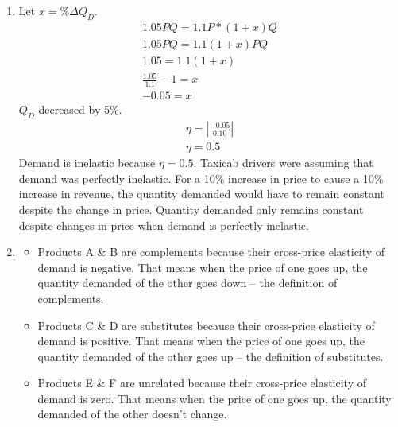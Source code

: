 \documentclass{article}
\begin{document}
\begin{enumerate}
\begin{enumerate}
	\end{enumerate}
	
\item Let $x = \% \Delta Q_D$.
	\begin{gather*}
	1.05PQ = 1.1P*(1 + x)Q \\
	1.05PQ = 1.1(1+x)PQ \\
	1.05 = 1.1(1+x) \\
	\frac{1.05}{1.1}-1 = x \\
	-0.05 = x
	\end{gather*}
	$Q_D$ decreased by 5\%.
	\begin{gather*}
	\eta = \left| \frac{-0.05}{0.10} \right| \\
	\eta = 0.5
	\end{gather*}
	Demand is inelastic because $\eta = 0.5$. Taxicab drivers were assuming that demand was perfectly inelastic. For a 10\% increase in price to cause a 10\% increase in revenue, the quantity demanded would have to remain constant despite the change in price. Quantity demanded only remains constant despite changes in price when demand is perfectly inelastic.
	
\item
	\begin{itemize}
	
	\item Products A \& B are complements because their cross-price elasticity of demand is negative. That means when the price of one goes up, the quantity demanded of the other goes down -- the definition of complements.

	\item Products C \& D are substitutes because their cross-price elasticity of demand is positive. That means when the price of one goes up, the quantity demanded of the other goes up -- the definition of substitutes.
	
	\item Products E \& F are unrelated because their cross-price elasticity of demand is zero. That means when the price of one goes up, the quantity demanded of the other doesn't change.
	
	\end{itemize}

\end{enumerate}
\end{document}
